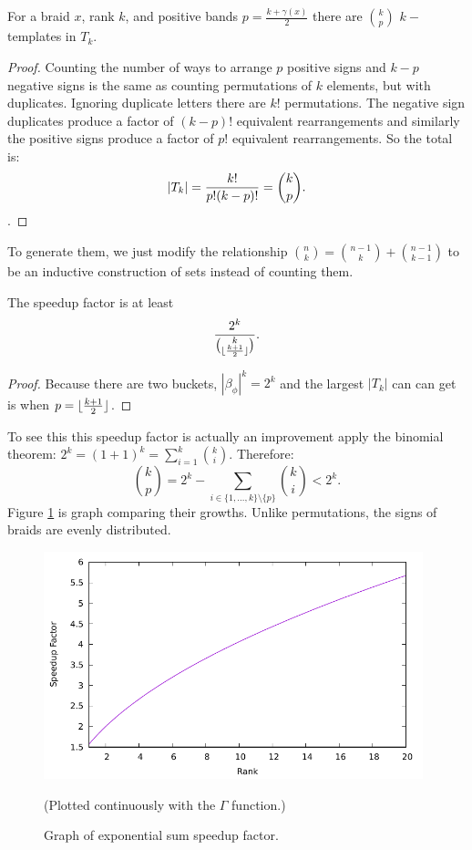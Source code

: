 \documentclass[12pt]{thesis}
\begin{document}
\begin{proposition}
    For a braid $x$, rank $k$, and positive bands $p = \frac{k + \gamma(x)}{2}$
    there are ${ k \choose p }$ $k-$ templates in $T_{k}$.
\end{proposition}

\begin{proof}
    Counting the number of ways to arrange $p$ positive signs and $k-p$ negative
    signs is the same as counting permutations of $k$ elements, but with duplicates.
    Ignoring duplicate letters there are $k!$ permutations.
    The negative sign duplicates produce a factor of $(k-p)!$ equivalent rearrangements
    and similarly the positive signs produce a factor of $p!$ equivalent rearrangements.
    So the total is:
    \[
        |T_{k}| = \frac{k!}{p!(k-p)!} = {k \choose p}. \qedhere
    \].
\end{proof}
To generate them, we just modify the
relationship ${n \choose k} = {n - 1 \choose k} + {n - 1 \choose k - 1 }$ to be an inductive
construction of sets instead of counting them.

\begin{theorem}
    The speedup factor is at least 
    \[
        \frac{2^{k}}{ { k \choose \lfloor \frac{k + 1}{2} \rfloor}}.
    \]
\end{theorem}

\begin{proof}
    Because there are two buckets, $|\beta_{\phi}|^{k} = 2^{k}$ and the largest $|T_{k}|$
    can can get is when $p = \lfloor \frac{k + 1}{2} \rfloor$.
\end{proof}
To see this this speedup factor is actually an improvement
apply the binomial theorem:
$2^{k} = (1 + 1)^{k} = \sum_{i=1}^{k} {k \choose i}$.
Therefore:
\[
    { k \choose p } = 2^{k} - \sum_{i \in \{ 1, \ldots, k \} \setminus \{ p \} } {k \choose i} < 2^{k}. 
\]
Figure \ref{fig:sum-speedup} is graph comparing their growths. 
Unlike permutations, the signs of braids are evenly distributed.

\begin{figure}[h]
    \centering
    \includegraphics[width=11cm]{sum-speedup.pdf}
    \caption{Graph of exponential sum speedup factor. }
    \label{fig:sum-speedup}
 
    (Plotted continuously with the $\Gamma$ function.)
\end{figure}
\end{document}
